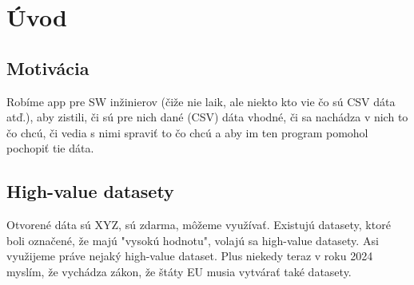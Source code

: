 \chapter*{Úvod}

\section{Motivácia}

Robíme app pre SW inžinierov (čiže nie laik, ale niekto kto vie čo sú CSV dáta atď.), aby zistili, či sú pre nich dané (CSV) dáta vhodné, či sa nachádza v nich to čo chcú, či vedia s nimi spraviť to čo chcú a aby im ten program pomohol pochopiť tie dáta.

\section{High-value datasety}

Otvorené dáta sú XYZ, sú zdarma, môžeme využívať. Existujú datasety, ktoré boli označené, že majú "vysokú hodnotu", volajú sa high-value datasety. Asi využijeme práve nejaký high-value dataset. Plus niekedy teraz v roku 2024 myslím, že vychádza zákon, že štáty EU musia vytvárať také datasety.
